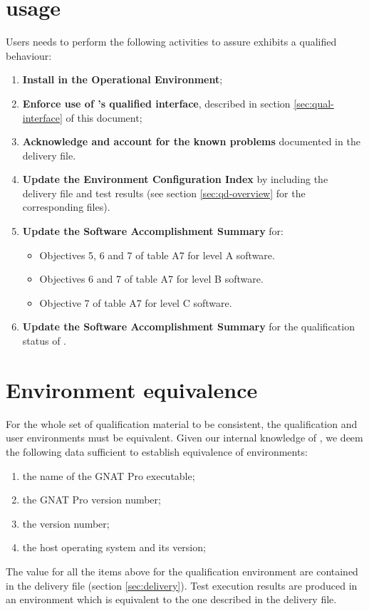 \documentclass {report}
\begin{document}
\section{\xcov{} usage}

Users needs to perform the following activities to assure \xcov{} exhibits
a qualified behaviour:

\begin{enumerate}
\item \textbf{Install \xcov{} in the Operational Environment};
%
\item \textbf{Enforce use of \xcov{}'s qualified interface}, described
  in section \ref{sec:qual-interface} of this document;
%
\item \textbf{Acknowledge and account for the known problems} documented in
  the delivery file.
%
\item \textbf{Update the Environment Configuration Index} by including the
  delivery file and test results (see section \ref{sec:qd-overview} for the
  corresponding files).
%
\item \textbf{Update the Software Accomplishment Summary} for:
\begin{itemize}
\item Objectives 5, 6 and 7 of table A7 for level A software.
\item Objectives 6 and 7 of table A7 for level B software.
\item Objective 7 of table A7 for level C software.
\end{itemize}
%
\item \textbf{Update the Software Accomplishment Summary} for the
  qualification status of \xcov{}.
\end{enumerate}

\section{Environment equivalence}
\label{sec:equivalence}

For the whole set of qualification material to be consistent, the
qualification and user environments must be equivalent.
%
Given our internal knowledge of \xcov{}, we deem the following data sufficient
to establish equivalence of environments:

\begin{enumerate}
\item the name of the GNAT Pro executable;
\item the GNAT Pro version number;
\item the \xcov{} version number;
\item the host operating system and its version;
\end{enumerate}

The value for all the items above for the qualification environment are
contained in the delivery file (section \ref{sec:delivery}). Test execution
results are produced in an environment which is equivalent to the one
described in the delivery file.
\end{document}
